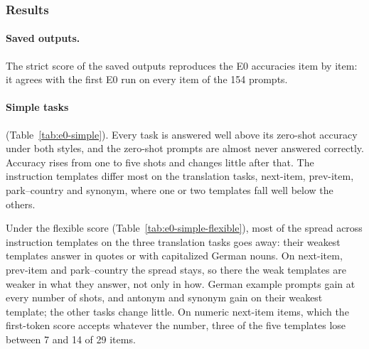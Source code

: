 \documentclass[11pt,a4paper]{article}
\begin{document}
\subsubsection{Results}\label{sec:res-e0}
\paragraph{Saved outputs.} The strict score of the saved outputs reproduces the E0 accuracies item by item: it agrees with the first E0 run on every item of the 154 prompts.

\paragraph{Simple tasks} (Table~\ref{tab:e0-simple}). Every task is answered well above its zero-shot accuracy under both styles, and the zero-shot prompts are almost never answered correctly. Accuracy rises from one to five shots and changes little after that. The instruction templates differ most on the translation tasks, next-item, prev-item, park--country and synonym, where one or two templates fall well below the others.

Under the flexible score (Table~\ref{tab:e0-simple-flexible}), most of the spread across instruction templates on the three translation tasks goes away: their weakest templates answer in quotes or with capitalized German nouns. On next-item, prev-item and park--country the spread stays, so there the weak templates are weaker in what they answer, not only in how. German example prompts gain at every number of shots, and antonym and synonym gain on their weakest template; the other tasks change little. On numeric next-item items, which the first-token score accepts whatever the number, three of the five templates lose between 7 and 14 of 29 items.

\begin{table}[H]
\centering\footnotesize

\caption{E0, simple tasks: strict accuracy per prompt style. Rule: the five instruction templates of \citet{yang2026shared}, mean and range; example: by number of shots; zero-shot: the prompts without task information. Items: dataset size.}
\label{tab:e0-simple}
\end{table}

\begin{table}[H]
\centering\footnotesize

\caption{E0, simple tasks: flexible accuracy per prompt style (Sec.~\ref{sec:evaluation}), on the same saved replies and with the same layout as Table~\ref{tab:e0-simple}.}
\label{tab:e0-simple-flexible}
\end{table}
\end{document}
